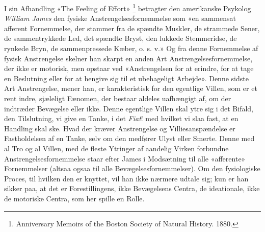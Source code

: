 \documentclass[12pt,a4paper,openany]{book}
\newcommand{\opage}[1]{\marginnote{\footnotesize\textit{[#1]}}}
\begin{document}
I sin Afhandling «The Feeling of Effort»%
\footnote[3]{Anniversary Memoirs of the Boston Society of Natural History.
1880.} betragter den amerikanske Psykolog \emph{William James} den fysiske
Anstrengelsesfornemmelse som «en sammensat afferent Fornemmelse, der stammer
fra de spændte Muskler, de strammede Sener, de sammentrykkede Led, det spændte
Bryst, den lukkede Stemmeridse, de rynkede Bryn, de sammenpressede Kæber, o. s.
v.» Og fra denne Fornemmelse af fysisk Anstrengelse skelner han skarpt en
\setcounter{footnote}{0}%
\opage{71}anden Art Anstrengelsesfornemmelse, der ikke er motorisk, men opstaar
ved «Anstrengelsen for at erindre, for at tage en Beslutning eller for at
hengive sig til et ubehageligt Arbejde». Denne sidste Art Anstrengelse, mener
han, er karakteristisk for den egentlige Villen, som er et rent indre,
sjæleligt Fænomen, der bestaar aldeles uafhængigt af, om der indtræder
Bevægelse eller ikke. Denne egentlige Villen skal ytre sig i det Bifald, den
Tilslutning, vi give en Tanke, i det \emph{Fiat}! med hvilket vi slaa fast, at
en Handling skal ske. Hvad der kræver Anstrengelse og Villiesanspændelse er
Fastholdelsen af en Tanke, selv om den medfører Ulyst eller Smerte. Denne med
al Tro og al Villen, med de fleste Ytringer af aandelig Virken forbundne
Anstrengelsesfornemmelse staar efter James i Modsætning til alle «afferente»
Fornemmelser (altsaa ogsaa til alle Bevægelsesfornemmelser). Om den
fysiologiske Proces, til hvilken den er knyttet, vil han ikke nærmere udtale
sig; kun er han sikker paa, at det er Forestillingens, ikke Bevægelsens Centra,
de ideationale, ikke de motoriske Centra, som her spille en Rolle.
\end{document}
